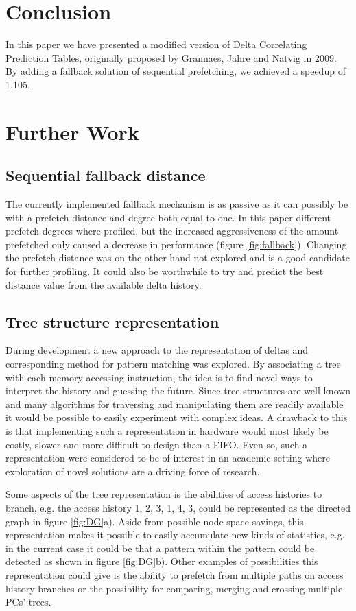 \documentclass[12pt,journal,compsoc]{IEEEtran}
\begin{document}
\section{Conclusion}
In this paper we have presented a modified version of Delta Correlating
Prediction Tables, originally proposed by Grannaes, Jahre and Natvig in 2009.
\cite{dcptpaper} By adding a fallback solution of sequential prefetching,
we achieved a speedup of 1.105.

\section{Further Work}

\subsection{Sequential fallback distance}
The currently implemented fallback mechanism is as passive
as it can possibly be with a prefetch distance and degree both equal
to one. In this paper different prefetch degrees where profiled, but
the increased aggressiveness of the amount prefetched only caused a
decrease in performance (figure \ref{fig:fallback}). Changing the prefetch
distance
was on the other hand not explored and is a good candidate for further
profiling. It could also be worthwhile to try and predict the best distance
value from the available delta history.

\subsection{Tree structure representation}
During development a new approach to the representation of deltas
and corresponding method for pattern matching was explored. By associating
a tree with each memory accessing instruction, the idea is to find novel ways
to interpret the history and guessing the future. Since tree structures
are well-known and many algorithms for traversing and manipulating them
are readily available it would be possible to easily experiment
with complex ideas. A drawback to this is that implementing such a
representation in hardware would most likely be costly, slower
and more difficult to design than a FIFO. Even so, such a
representation were considered to be of interest in an academic
setting where exploration of novel solutions are a driving force of
research.

Some aspects of the tree representation is the abilities of access histories
to branch, e.g. the access history 1, 2, 3, 1, 4, 3, could be represented
as the directed graph in figure \ref{fig:DG}a).
Aside from possible node space savings, this representation makes it
possible to easily accumulate new kinds of statistics, e.g. in the
current case it could be that a pattern within the pattern could be
detected as shown in figure \ref{fig:DG}b). Other examples of possibilities
this representation could give is the ability to prefetch from multiple
paths on access history branches or the possibility for comparing,
merging and crossing multiple PCs' trees.
\end{document}
